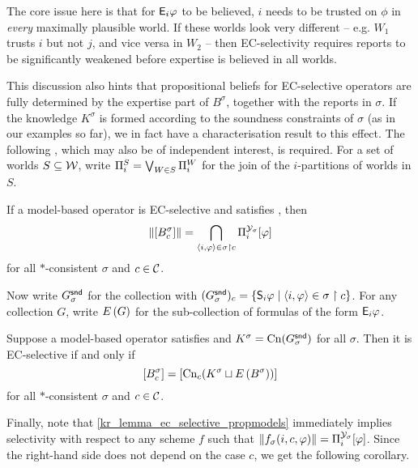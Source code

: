 The core issue here is that for $\mathsf{E}_i\varphi$ to be believed, $i$ needs to be
trusted on $\phi$ in \emph{every} maximally plausible world. If these worlds
look very different -- e.g. $W_1$ trusts $i$ but not $j$, and vice versa in
$W_2$ --  then EC-selectivity requires reports to be significantly weakened
before expertise is believed in all worlds.

This discussion also hints that propositional beliefs for EC-selective
operators are fully determined by the expertise part of $B^\sigma$, together
with the reports in $\sigma$. If the knowledge $K^\sigma$ is formed according
to the soundness constraints of $\sigma$ (as in our examples so far), we in
fact have a characterisation result to this effect. The following
, which may also be of independent
interest, is required. For a set of worlds $S \subseteq \mathcal{W}$, write $\Pi^S_i =
\bigvee_{W \in S}{\Pi^W_i}$ for the join of the $i$-partitions of worlds in
$S$.

\begin{lemma}
    \label{kr_lemma_ec_selective_propmodels}
    If a model-based operator is EC-selective and satisfies \soundness{}, then
    \[
        \|{\left[{B^\sigma_c}\right]}\|
        =
        \bigcap_{\langle {i, \varphi} \rangle \in \sigma \upharpoonright c}{
            \Pi^{\mathcal{Y}_\sigma}_i[\varphi]
        }
    \]
    for all $\ast$-consistent $\sigma$ and $c \in \mathcal{C}$.
\end{lemma}


Now write $G^{\mathsf{snd}}_\sigma$ for the collection with $(G^{\mathsf{snd}}_\sigma)_c =
\{\mathsf{S}_i\varphi \mid \langle {i, \varphi} \rangle \in \sigma \upharpoonright c\}$. For any collection $G$,
write $E\left({G}\right)$ for the sub-collection of formulas of the form $\mathsf{E}_i\varphi$.

\begin{theorem}
    \label{kr_thm_ec_selectivity_characterisation}
    Suppose a model-based operator satisfies \consistency{} and $K^\sigma =
    \operatorname{Cn}(G^{\mathsf{snd}}_\sigma)$ for all $\sigma$. Then it is EC-selective if and only
    if
    \[
        \left[{B^\sigma_c}\right]
        =
        \left[{\operatorname{Cn}_c(K^\sigma \sqcup E\left({B^\sigma}\right))}\right]
    \]
    for all $\ast$-consistent $\sigma$ and $c \in \mathcal{C}$.
\end{theorem}


Finally, note that \cref{kr_lemma_ec_selective_propmodels} immediately implies
selectivity with respect to any scheme $f$ such that $\|{f_\sigma(i, c,
\varphi)}\| = \Pi^{\mathcal{Y}_\sigma}_i[\varphi]$. Since the right-hand side does not depend on
the case $c$, we get the following corollary.

